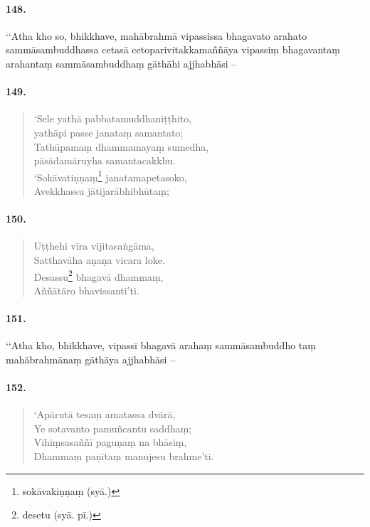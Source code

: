 \paragraph{148.} ‘‘Atha kho so, bhikkhave, mahābrahmā vipassissa bhagavato arahato sammāsambuddhassa cetasā cetoparivitakkamaññāya vipassiṃ bhagavantaṃ arahantaṃ sammāsambuddhaṃ gāthāhi ajjhabhāsi –

\paragraph{149.}\begin{verse}
  ‘Sele yathā pabbatamuddhaniṭṭhito, \\yathāpi passe janataṃ samantato;\\
  Tathūpamaṃ dhammamayaṃ sumedha, \\pāsādamāruyha samantacakkhu.\\
  ‘Sokāvatiṇṇaṃ\footnote{sokāvakiṇṇaṃ (syā.)} janatamapetasoko,\\
  Avekkhassu jātijarābhibhūtaṃ;
\end{verse}

\paragraph{150.}\begin{verse}
  Uṭṭhehi vīra vijitasaṅgāma,\\
  Satthavāha aṇaṇa vicara loke.\\
  Desassu\footnote{desetu (syā. pī.)} bhagavā dhammaṃ,\\
  Aññātāro bhavissantī’ti.
\end{verse}

\paragraph{151.} ‘‘Atha kho, bhikkhave, vipassī bhagavā arahaṃ sammāsambuddho taṃ mahābrahmānaṃ gāthāya ajjhabhāsi –

\paragraph{152.}\begin{verse}
  ‘Apārutā tesaṃ amatassa dvārā,\\
  Ye sotavanto pamuñcantu saddhaṃ;\\
  Vihiṃsasaññī paguṇaṃ na bhāsiṃ,\\
  Dhammaṃ paṇītaṃ manujesu brahme’ti.\\
\end{verse}

